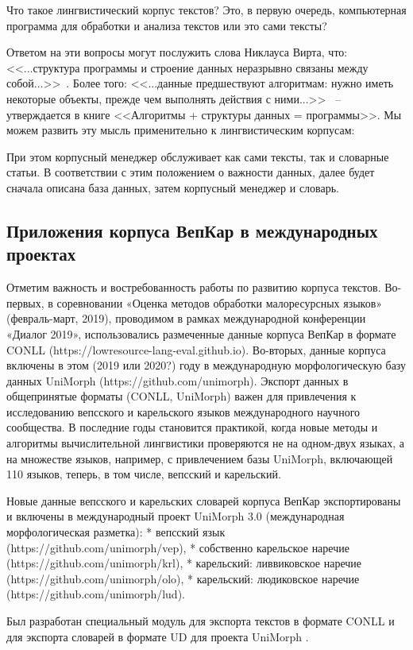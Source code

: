 Что такое лингвистический корпус текстов? Это, в первую очередь, компьютерная программа для обработки и анализа текстов или это сами тексты? 

Ответом на эти вопросы могут послужить слова Никлауса Вирта, что: 
<<...структура программы и строение данных неразрывно связаны между собой...>>~\cite[с.~9]{Wirth1989AlgorithmsAndDataStructure}. 
Более того:   
<<...данные предшествуют алгоритмам: нужно иметь некоторые объекты, 
прежде чем выполнять действия с ними...>>~\cite[с.~8]{Wirth1985Algorithms+} 
-- утверждается в книге <<Алгоритмы + структуры данных = программы>>.
Мы можем развить эту мысль применительно к лингвистическим корпусам:
        

\noindent
При этом корпусный менеджер обслуживает как сами тексты, так и словарные статьи. 
В соответствии с этим положением о важности данных, далее будет  
сначала описана база данных, затем корпусный менеджер и словарь.

\subsection{Приложения корпуса ВепКар в международных проектах} \label{sect_VepKar_international}


Отметим важность и востребованность работы по развитию корпуса текстов. 
Во-первых, в соревновании «Оценка методов обработки малоресурсных языков» (февраль-март, 2019), проводимом в рамках международной конференции «Диалог 2019», использовались размеченные данные корпуса ВепКар в формате CONLL (https://lowresource-lang-eval.github.io). 
Во-вторых, данные корпуса включены в этом (2019 или 2020?) году в международную морфологическую базу данных UniMorph (https://github.com/unimorph). Экспорт данных в общепринятые форматы (CONLL, UniMorph) важен для привлечения к исследованию вепсского и карельского языков международного научного сообщества. В последние годы становится практикой, когда новые методы и алгоритмы вычислительной лингвистики проверяются не на одном-двух языках, а на множестве языков, например, с привлечением базы UniMorph, включающей 110 языков, теперь, в том числе, вепсский и карельский. 

Новые данные вепсского и карельских словарей корпуса ВепКар экспортированы и включены в международный проект UniMorph 3.0 (международная морфологическая разметка):
* вепсский язык (https://github.com/unimorph/vep),
* собственно карельское наречие (https://github.com/unimorph/krl),
* карельский: ливвиковское наречие (https://github.com/unimorph/olo),
* карельский: людиковское наречие (https://github.com/unimorph/lud).

Был разработан специальный модуль для экспорта текстов в формате CONLL и 
для экспорта словарей в формате UD для проекта UniMorph .












